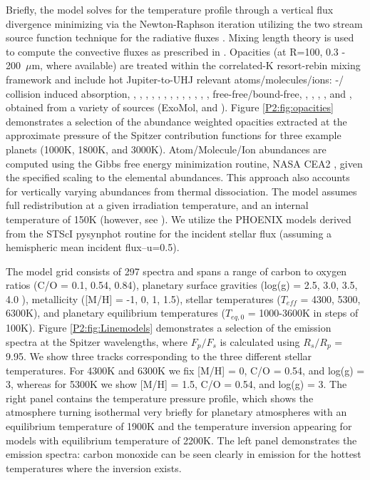 Briefly, the model solves for the temperature profile through a vertical flux divergence minimizing via the Newton-Raphson iteration \citep{McKay1989} utilizing the two stream source function technique for the radiative fluxes \citep{Toon1989}. Mixing length theory is used to compute the convective fluxes as prescribed in \citet{Hubeny2017}.  Opacities (at R=100, 0.3 - 200~$\mu$m, where available) are treated within the correlated-K resort-rebin mixing framework \citep{Lacis1991, Amundsen2017} and include hot Jupiter-to-UHJ relevant atoms/molecules/ions: -/ collision induced absorption, , , , , , , , , , , , , ,  free-free/bound-free, , , , , and , obtained from a variety of sources (ExoMol, \citet{Freedman2008, Freedman2014} and \citet{Kurucz1995}). Figure \ref{P2:fig:opacities} demonstrates a selection of the abundance weighted opacities extracted at the approximate pressure of the Spitzer contribution functions for three example planets (1000K, 1800K, and 3000K). Atom/Molecule/Ion abundances are computed using the Gibbs free energy minimization routine, NASA CEA2 \citep{Gordon1994}, given the specified scaling to the \citet{Lodders2009} elemental abundances. This approach also accounts for vertically varying abundances from thermal dissociation. The model assumes full redistribution at a given irradiation temperature, and an internal temperature of 150K (however, see \citet{Thorngren2019}). We utilize the PHOENIX \citep{Allard2011} models derived from the STScI pysynphot routine for the incident stellar flux (assuming a hemispheric mean incident flux--u=0.5).

The model grid consists of 297 spectra and spans a range of carbon to oxygen ratios (C/O = 0.1, 0.54, 0.84), planetary surface gravities (log(g) = 2.5, 3.0, 3.5, 4.0 ), metallicity ([M/H] = -1, 0, 1, 1.5), stellar temperatures ($T_{eff}$ = 4300, 5300, 6300K), and planetary equilibrium temperatures ($T_{eq,\textit{0}}$ = 1000-3600K in steps of 100K).
Figure \ref{P2:fig:Linemodels} demonstrates a selection of the emission spectra at the Spitzer wavelengths, where $F_p/F_s$ is calculated using $R_s/R_p$ = 9.95. We show three tracks corresponding to the three different stellar temperatures. For 4300K and 6300K we fix [M/H] = 0, C/O = 0.54, and log(g) = 3, whereas for 5300K we show [M/H] = 1.5, C/O = 0.54, and log(g) = 3. The right panel contains the temperature pressure profile, which shows the atmosphere turning isothermal very briefly for planetary atmospheres with an equilibrium temperature of 1900K and the temperature inversion appearing for models with equilibrium temperature of 2200K. The left panel demonstrates the emission spectra: carbon monoxide can be seen clearly in emission for the hottest temperatures where the inversion exists.

